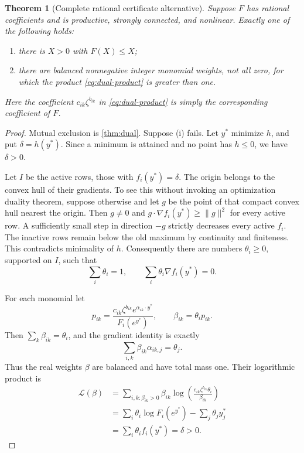 \documentclass[11pt,a4paper]{article}
\newtheorem{theorem}{Theorem}[section]
\theoremstyle{definition}
\theoremstyle{remark}
\begin{document}
\begin{theorem}[Complete rational certificate alternative]\label{thm:alternative}
Suppose $F$ has rational coefficients and is productive, strongly connected,
and nonlinear. Exactly one of the following holds:
\begin{enumerate}[label=(\roman*)]
 \item there is $X>0$ with $F(X)\leq X$;
 \item there are balanced nonnegative integer monomial weights, not all zero,
       for which the product \eqref{eq:dual-product} is greater than one.
\end{enumerate}
Here the coefficient $c_{ik}\zeta^{b_{ik}}$ in
\eqref{eq:dual-product} is simply the corresponding coefficient of $F$.
\end{theorem}
\begin{proof}
Mutual exclusion is \cref{thm:dual}. Suppose (i) fails. Let $y^*$ minimize
$h$, and put $\delta=h(y^*)$. Since a minimum is attained and no point has
$h\leq0$, we have $\delta>0$.

Let $I$ be the active rows, those with $f_i(y^*)=\delta$.
The origin belongs to the convex hull of their gradients. To see this
without invoking an optimization duality theorem, suppose otherwise and let
$g$ be the point of that compact convex hull nearest the origin.
Then $g\ne0$ and
$g\cdot\nabla f_i(y^*)\geq\|g\|^2$ for every active row.
A sufficiently small step in direction $-g$ strictly decreases every active
$f_i$. The inactive rows remain below the old maximum by continuity and
finiteness. This contradicts minimality of $h$.
Consequently there are numbers $\theta_i\geq0$, supported on $I$, such that
\[
 \sum_i\theta_i=1,\qquad
 \sum_i\theta_i\nabla f_i(y^*)=0.
\]

For each monomial let
\[
 p_{ik}=
 \frac{c_{ik}\zeta^{b_{ik}}e^{\alpha_{ik}\cdot y^*}}
      {F_i(e^{y^*})},\qquad
 \beta_{ik}=\theta_i p_{ik}.
\]
Then $\sum_k\beta_{ik}=\theta_i$, and the gradient identity is exactly
\[
 \sum_{i,k}\beta_{ik}\alpha_{ik,j}=\theta_j.
\]
Thus the real weights $\beta$ are balanced and have total mass one.
Their logarithmic product is
\begin{align*}
 \mathcal L(\beta)
 &=\sum_{i,k:\beta_{ik}>0}
 \beta_{ik}\log\left(
   \frac{c_{ik}\zeta^{b_{ik}}\theta_i}{\beta_{ik}}\right)\\
 &=\sum_i\theta_i\log F_i(e^{y^*})
   -\sum_j\theta_j y_j^*\\
 &=\sum_i\theta_i f_i(y^*)=\delta>0.
\end{align*}


\end{proof}
\end{document}
